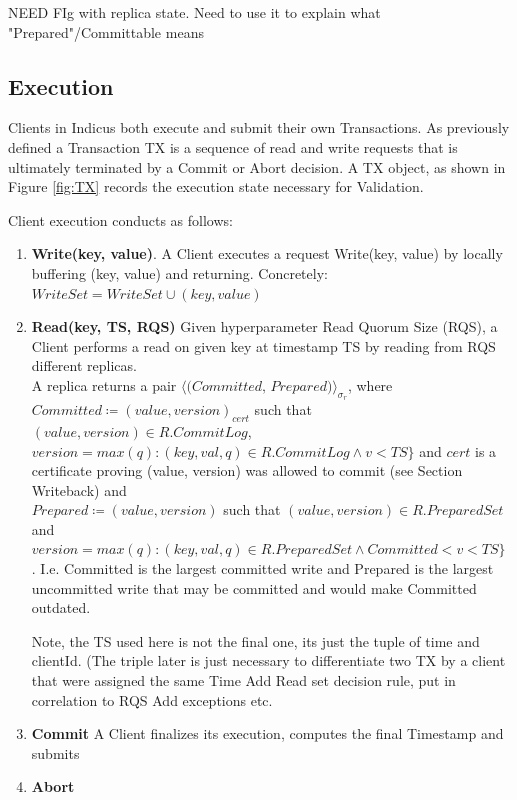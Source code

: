 NEED FIg with replica state. Need to use it to explain what "Prepared"/Committable means
\subsection{Execution}
Clients in Indicus both execute and submit their own Transactions. As previously defined a Transaction TX is a sequence of read and write requests that is ultimately terminated by a Commit or Abort decision. A TX object, as shown in Figure \ref{fig:TX} records the execution state necessary for Validation.

Client execution conducts as follows:\\

\begin{enumerate}
\item \textbf{Write(key, value)}. A Client executes a request Write(key, value) by locally buffering (key, value) and returning. Concretely: $WriteSet = WriteSet \cup (key, value)$
\item \textbf{Read(key, TS, RQS)} Given hyperparameter Read Quorum Size (RQS), a Client performs a read on given key at timestamp TS by reading from RQS different replicas. \\

A replica returns a pair $\langle \textit{(Committed, Prepared)} \rangle _{\sigma_r}$, where \\
$Committed \coloneqq (value, version)_{cert}$ such that $ (value, version) \in R.CommitLog$, $version = max(q) : (key, val, q) \in R.CommitLog \land v < TS \}$ and $cert$ is a certificate proving (value, version) was allowed to commit (see Section Writeback) and\\
 $Prepared \coloneqq (value, version)$ such that $(value, version) \in R.PreparedSet$ and $version = max(q) : (key, val, q) \in R.PreparedSet \land Committed < v < TS \}$ .
I.e. Committed is the largest committed write and Prepared is the largest uncommitted write that may be  committed and would make Committed outdated. 


Note, the TS used here is not the final one, its just the tuple of time and clientId. (The triple later is just necessary to differentiate two TX by a client that were assigned the same Time
Add Read set decision rule, put in correlation to RQS
Add exceptions etc.


\item \textbf{Commit} A Client finalizes its execution, computes the final Timestamp and submits 

\item \textbf{Abort}

\end{enumerate}
 


